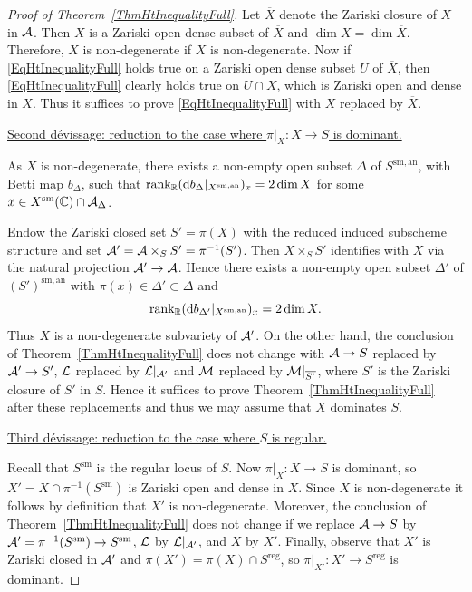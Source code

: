 \begin{proof}[Proof of Theorem~\ref{ThmHtInequalityFull}]
Let $\overline{X}$ denote the
Zariski closure of $X$ in $\mathcal{A}$. Then $X$ 
is a Zariski open dense subset of $\overline{X}$ and $\dim X = \dim
\overline{X}$. %
Therefore, $\overline X$ is non-degenerate if $X$ is non-degenerate.
Now if
\eqref{EqHtInequalityFull} holds true on a Zariski open dense subset
$U$ of $\overline{X}$, then \eqref{EqHtInequalityFull} clearly holds
true on $U \cap X$, which is Zariski open and dense in $X$. Thus it suffices to prove \eqref{EqHtInequalityFull} with $X$ replaced by $\overline{X}$. %


\ul{Second d\'{e}vissage: reduction to the case where $\pi|_{X}\colon X\rightarrow 
  S$ is dominant.} 
  
  As $X$ is non-degenerate, there exists a non-empty open subset $\Delta$ of $S^{\mathrm{sm,an}}$, with Betti map $b_{\Delta}$, such that $\mathrm{rank}_{{\mathbb{R}}}(\mathrm{d}b_{\Delta}|_{X^{\mathrm{sm,an}}})_x = 2 \dim X$ for some $x \in X^{\mathrm{sm}}({\mathbb{C}}) \cap \mathcal{A}_{\Delta}$.

Endow the Zariski closed set $S'=\pi(X)$ with the reduced induced
subscheme structure and set $\mathcal{A}' = \mathcal{A} \times_S S' =
\pi^{-1}(S')$. Then $X \times_S S'$ identifies with $X$ via the natural projection $\mathcal{A}' \rightarrow \mathcal{A}$. Hence there exists a non-empty open subset $\Delta'$
of $(S')^{\mathrm{sm,an}}$ with $\pi(x) \in \Delta'\subset \Delta$ and
\[
 \mathrm{rank}_{{\mathbb{R}}} (\mathrm{d}b_{\Delta'}|_{X^{\mathrm{sm,an}}})_x = 2\dim X.
\]
Thus $X$ is a non-degenerate subvariety of $\mathcal{A}'$. On the other hand,
the conclusion of  Theorem~\ref{ThmHtInequalityFull} does not change
with $\mathcal{A} \rightarrow S$ replaced by $\mathcal{A}' \rightarrow S'$, ${\mathcal L}$
replaced by ${\mathcal L}|_{\mathcal{A}'}$ and ${\mathcal M}$ replaced by ${\mathcal M}|_{\overline{S'}}$,
 where $\overline{S'}$ is the Zariski closure of $S'$ in $\overline{S}$.
Hence it suffices to prove Theorem~\ref{ThmHtInequalityFull} after
these replacements and thus we may assume that $X$ dominates $S$.


\ul{Third d\'{e}vissage: reduction to the case where $S$ is regular.}

Recall that $S^{\mathrm{sm}}$ is the regular locus of $S$.
Now $\pi|_X\colon X\rightarrow S$ is dominant, so
$X'=X\cap \pi^{-1}(S^{\mathrm{sm}})$ is Zariski open and dense in
$X$. 
Since $X$ is non-degenerate it follows by definition that  $X'$ is
non-degenerate. Moreover, the conclusion of
Theorem~\ref{ThmHtInequalityFull} does not change if we replace $\mathcal{A}
\rightarrow S$ by $\mathcal{A}' = \pi^{-1}(S^{\mathrm{sm}})
\rightarrow S^{\mathrm{sm}}$, ${\mathcal L}$ by ${\mathcal L}|_{\mathcal{A}'}$,
and $X$ by $X'$.
Finally, observe that $X'$ is Zariski closed in $\mathcal{A}'$
and $\pi(X') = \pi(X)\cap S^{\mathrm{reg}}$, so $\pi|_{X'}\colon X'
\rightarrow S^{\mathrm{reg}}$ is dominant. 



\end{proof}
